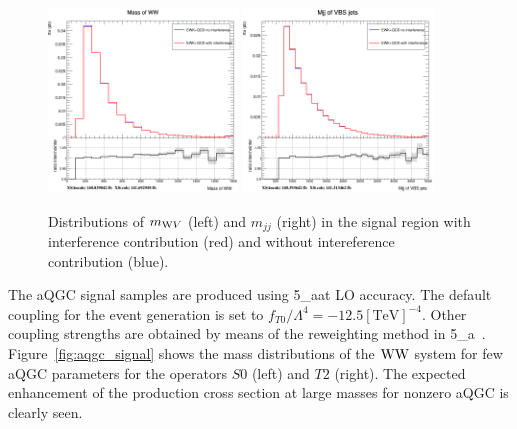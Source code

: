 \begin{figure}[!htbp]
\centering
\includegraphics[width=0.45\textwidth]{Plots/plots/interference_comparison_mww.png}
\includegraphics[width=0.45\textwidth]{Plots/plots/interference_comparison_mjj_vbs.png}
\caption{Distributions of $m_{\mathrm{W} V}$ (left) and $m_{jj}$ (right) in the signal region with interference contribution (red) and without intereference contribution (blue).}
\label{fig:interference}
\end{figure}

The aQGC signal samples are produced using \MADGRAPH{}5\_a\MCATNLO at LO accuracy. The default coupling for the event generation is set to $f_{T0} / \Lambda^{4} = -12.5 [\mathrm{TeV}]^{-4}$. Other coupling strengths are obtained by means of the reweighting method in \MADGRAPH{}5\_a\MCATNLO~\cite{Mattelaer2016,Mattelaer-reweight}. Figure~\ref{fig:aqgc_signal} shows the mass distributions of the  $\mathrm{W} \mathrm{W}$ system for few aQGC parameters for the operators $S0$ (left) and $T2$ (right). The expected enhancement of the production cross section at large masses for nonzero aQGC is clearly seen.      
  
